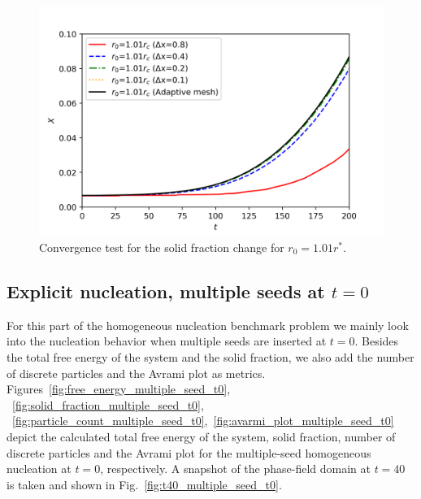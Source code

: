 \documentclass[preprint,12pt]{elsarticle}
\begin{document}
%
%
\begin{center}
\begin{figure} 
\begin{centering}
\includegraphics[scale=0.65]{convergence_single_seed.PNG}
\par\end{centering}
\caption{Convergence test for the solid fraction change for $r_0=1.01r^*$.}\label{fig:convergence_single_seed}
\end{figure}
\par\end{center}
%

\subsection{Explicit nucleation, multiple seeds at $t=0$}

For this part of the homogeneous nucleation benchmark problem we mainly look into the nucleation behavior when multiple seeds are inserted at $t=0$. Besides the total free energy of the system and the solid fraction, we also add the number of discrete particles and the Avrami plot as metrics. Figures~\ref{fig:free_energy_multiple_seed_t0}, ~\ref{fig:solid_fraction_multiple_seed_t0}, ~\ref{fig:particle_count_multiple_seed_t0},~\ref{fig:avarmi_plot_multiple_seed_t0} depict the calculated total free energy of the system, solid fraction, number of discrete particles and the Avrami plot for the multiple-seed homogeneous nucleation at $t=0$, respectively. A snapshot of the phase-field domain at $t=40$ is taken and shown in Fig.~\ref{fig:t40_multiple_seed_t0}. %
\end{document}
